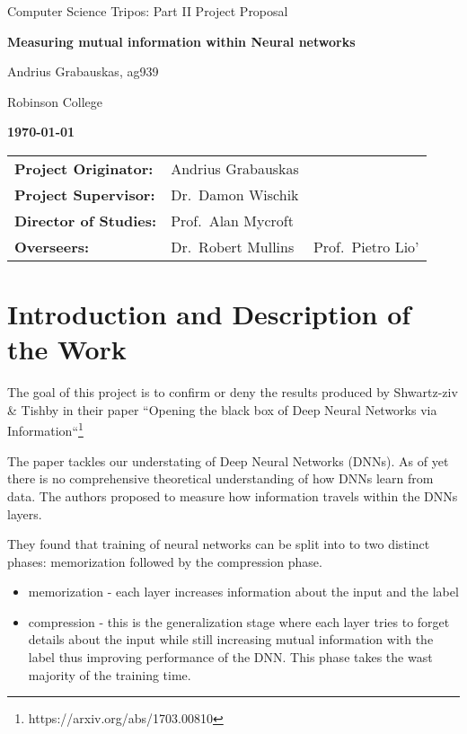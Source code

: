 \documentclass[12pt]{article}
\begin{document}


\thispagestyle{empty}

\centerline{\large Computer Science Tripos: Part II Project Proposal}
\vspace{0.4in}
\centerline{\Large\bf Measuring mutual information within Neural networks}
\vspace{0.3in}

\centerline{Andrius Grabauskas, ag939}
\centerline{Robinson College}

\centerline{\large \textbf{\today}}

\vspace{1in}

\begin{tabular}{ p{4cm} p{4.5cm} l }
{\bf Project Originator:} & Andrius Grabauskas & \\[3mm]
{\bf Project Supervisor:} & Dr.\ Damon Wischik \\[3mm]
{\bf Director of Studies:} & Prof.\ Alan Mycroft \\[3mm]
{\bf Overseers:} & Dr.\ Robert Mullins & Prof.\ Pietro Lio' \\[3mm]
\end{tabular}

\vspace{0.75in}

\section*{Introduction and Description of the Work}

The goal of this project is to confirm or deny the results produced by
Shwartz-ziv \& Tishby in their paper ``Opening the black box of Deep Neural
Networks via Information``\footnote{https://arxiv.org/abs/1703.00810}

The paper tackles our understating of Deep Neural Networks (DNNs). As of yet
there is no comprehensive theoretical understanding of how DNNs learn from data.
The authors proposed to measure how information travels within the DNNs layers.

They found that training of neural networks can be split into to two distinct
phases: memorization followed by the compression phase.
\begin{itemize}
  \item memorization - each layer increases information about the input and the
    label
  \item compression  - this is the generalization stage where each layer tries
    to forget details about the input while still increasing mutual information
    with the label thus improving performance of the DNN. This phase takes the
    wast majority of the training time.
\end{itemize}
\end{document}
